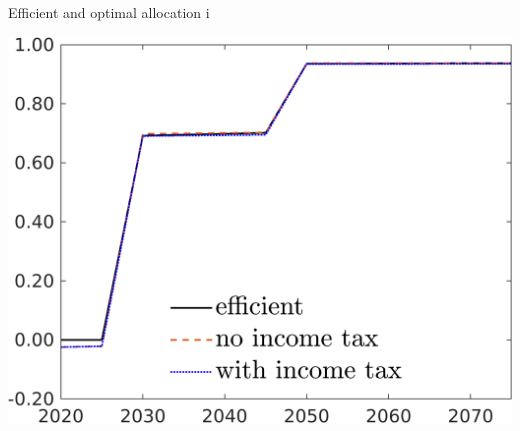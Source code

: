 \documentclass[11pt,aspectratio=169]{beamer}
\begin{document}
\begin{frame}{Efficient and optimal allocation i}
	\centering
\begin{minipage}[]{0.32\textwidth}
	\includegraphics[width=1\textwidth]{../codding_model/own_basedOnFried/optimalPol_elastS_DisuSci/figures/all_1705/tauf_CompEffOPT_T_NoTaus_spillover0_noskill0_sep1_BN0_ineq0_red0_xgrowth0_zero0_countec0_etaa0.79_lgd1.png}
\end{minipage}
\begin{minipage}[]{0.05\textwidth}
	\ \ \\ 
	\ \ 
\end{minipage}
\begin{minipage}[]{0.32\textwidth}

\end{minipage}
\end{frame}
\end{document}
